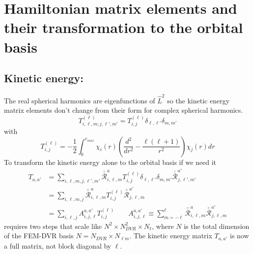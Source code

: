 \documentclass[%
pra%
,twocolumn%
,amssymb, nobibnotes, aps,
longbibliography
]{revtex4-1}
\begin{document}
\section{Hamiltonian matrix elements and their transformation to the orbital basis}


\subsection{Kinetic energy:}  
The real spherical harmonics are eigenfunctions of $\hat{L}^2$ so the kinetic energy matrix
elements don't change from their form for complex spherical harmonics.
\begin{equation}
T_{i,\ell,m;j,\ell',m'}^{(\ell)} =  T_{i,j}^{(\ell)}  \delta_{\ell,\ell'} \delta_{m,m'}
\end{equation}
with
\begin{equation}
T_{i,j}^{(\ell)} = -\frac{1}{2} \int_0^{r_{max}} \chi_i(r)
\left(\frac{d^2}{dr^2}-\frac{\ell(\ell+1)}{r^2}\right)
\chi_j(r) dr
\end{equation}
To transform the kinetic energy alone to the orbital basis if we need it
\begin{equation}
\begin{split}
T_{a,a'}&=  \sum_{i,\ell,m,j,\ell',m'} \bar{\bar{{\mathcal{R}}}}_{i,\ell,m}^a T_{i,j}^{(\ell)}  \delta_{\ell,\ell'} \delta_{m,m'}\bar{\bar{{\mathcal{R}}}}_{j,\ell',m'}^{a'}\\
&=  \sum_{i,\ell,m,j} \bar{\bar{{\mathcal{R}}}}_{i,\ell,m}^a T_{i,j}^{(\ell)} \bar{\bar{{\mathcal{R}}}}_{j,\ell,m}^{a'} \\
&= \sum_{i,\ell,j}  A^{a,a'}_{i,j,\ell}T_{i,j}^{(\ell)} \qquad  A^{a,a'}_{i,j,\ell} \equiv\sum_{m=-\ell}^\ell  \bar{\bar{{\mathcal{R}}}}_{i,\ell,m}^a  \bar{\bar{{\mathcal{R}}}}_{j,\ell,m}^{a'}
\end{split}
\end{equation}
requires two steps that scale like $N^2 \times N_{DVR}^2 \times N_\ell$, where $N$ is the total dimension of the FEM-DVR basis $N = N_{DVR} \times N_{\ell m}$.  The kinetic energy matrix $T_{a,a'}$ is now a full matrix, not block diagonal by $\ell$. 
 
\end{document}
